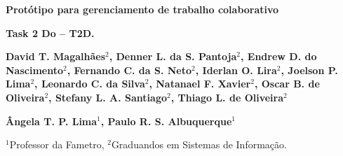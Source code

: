 \begin{center}
	\Large{\textbf{Protótipo para gerenciamento de trabalho colaborativo}}
	
	\large{\textbf{Task 2 Do – T2D.}}

	\small{\textbf{David T. Magalhães$^2$, Denner L. da S. Pantoja$^2$, Endrew D. do Nascimento$^2$, Fernando C. da S. Neto$^2$, Iderlan O. Lira$^2$, Joelson P. Lima$^2$, Leonardo C. da Silva$^2$, Natanael F. Xavier$^2$, Oscar B. de Oliveira$^2$, Stefany L. A. Santiago$^2$,  Thiago L. de Oliveira$^2$}}

	\textbf{Ângela T. P. Lima$^1$, Paulo R. S. Albuquerque$^1$}

	$^1$Professor da Fametro, $^2$Graduandos em Sistemas de Informação.
\end{center}







